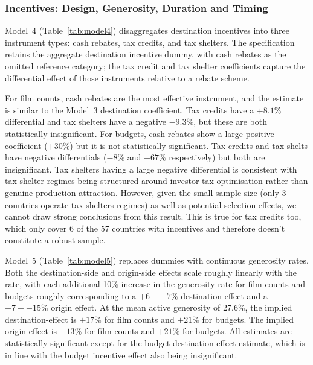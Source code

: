 \subsubsection{Incentives: Design, Generosity, Duration and Timing}

Model~4 (Table~\ref{tab:model4}) disaggregates destination incentives into three instrument types: cash rebates, tax credits, and tax shelters. The specification retains the aggregate destination incentive dummy, with cash rebates as the omitted reference category; the tax credit and tax shelter coefficients capture the differential effect of those instruments relative to a rebate scheme.

For film counts, cash rebates are the most effective instrument, and the estimate is similar to the Model~3 destination coefficient. Tax credits have a $+8.1\%$ differential and tax shelters have a negative $-9.3\%$, but these are both statistically insignificant. For budgets, cash rebates show a large positive coefficient ($+30\%$) but it is not statistically significant. Tax credits and tax shelts have negative differentials ($-8\%$ and $-67\%$ respectively) but both are insignificant. Tax shelters having a large negative differential is consistent with tax shelter regimes being structured around investor tax optimisation rather than genuine production attraction. However, given the small sample size (only 3 countries operate tax shelters regimes) as well as potential selection effects, we cannot draw strong conclusions from this result. This is true for tax credits too, which only cover 6 of the 57 countries with incentives and therefore doesn't constitute a robust sample.

Model~5 (Table~\ref{tab:model5}) replaces dummies with continuous generosity rates. Both the destination-side and origin-side effects scale roughly linearly with the rate, with each additional 10\% increase in the generosity rate for film counts and budgets roughly corresponding to a $+6--7\%$ destination effect and a $-7--15\%$ origin effect. At the mean active generosity of 27.6\%, the implied destination-effect is  $+17\%$ for film counts and $+21\%$ for budgets. The implied origin-effect is $-13\%$ for film counts and $+21\%$ for budgets. All estimates are statistically significant except for the budget destination-effect estimate, which is in line with the budget incentive effect also being insignificant.

